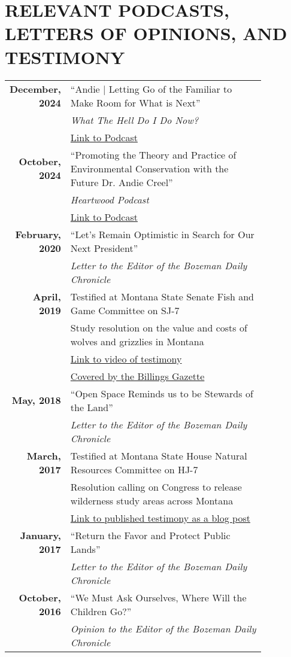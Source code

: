 \documentclass[11pt]{article}
\begin{document}
\section*{RELEVANT PODCASTS, LETTERS OF OPINIONS, AND TESTIMONY}
\begin{longtable}{>{\bfseries}r p{0.85\linewidth}} %
December, 2024 & “Andie | Letting Go of the Familiar to Make Room for What is Next” \\
    & \textit{What The Hell Do I Do Now?}\\
    & \href{https://open.spotify.com/episode/7bswDIxoYApUMYuF7UPw6C?si=b8d9c4fdcc804742}{Link to Podcast} \\[1ex]
October, 2024 & “Promoting the Theory and Practice of Environmental Conservation with the Future Dr. Andie Creel” \\
    & \textit{Heartwood Podcast} \\
    & \href{https://podcasts.apple.com/us/podcast/heartwood/id1474971310?i=1000673543724}{Link to Podcast} \\[1ex]
February, 2020 & “Let’s Remain Optimistic in Search for Our Next President” \\
    & \textit{Letter to the Editor of the Bozeman Daily Chronicle} \\[1ex]
April, 2019 & Testified at Montana State Senate Fish and Game Committee on SJ-7 \\
    & Study resolution on the value and costs of wolves and grizzlies in Montana \\
    & \href{https://www.facebook.com/watch/?v=2242142425832448}{Link to video of testimony} \\
    & \href{https://billingsgazette.com/outdoors/montana-could-study-of-economic-costs-benefits-of-wolves-grizzlies/article_4cba1d42-20a7-535b-a06c-49b800b1fe67.html?fbclid=IwAR2AH4iV9oVMiqb84HeFRVAxnHxhk-furTRHPYwgPYg9yOZv9gZg9rW6eJ4}{Covered by the Billings Gazette} \\[1ex]
May, 2018 & “Open Space Reminds us to be Stewards of the Land” \\
    & \textit{Letter to the Editor of the Bozeman Daily Chronicle}\\[1ex]
March, 2017 & Testified at Montana State House Natural Resources Committee on HJ-7 \\
    & Resolution calling on Congress to release wilderness study areas across Montana \\
    & \href{https://linktoblogpost.com}{Link to published testimony as a blog post} \\[1ex]
January, 2017 & “Return the Favor and Protect Public Lands” \\
    & \textit{Letter to the Editor of the Bozeman Daily Chronicle} \\[1ex]
October, 2016 & “We Must Ask Ourselves, Where Will the Children Go?” \\
    & \textit{Opinion to the Editor of the Bozeman Daily Chronicle} \\
\end{longtable}
\end{document}
